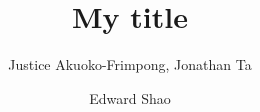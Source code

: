 



\addtolength{\oddsidemargin}{-.5in}%
\addtolength{\evensidemargin}{-1in}%
\addtolength{\textwidth}{1in}%
\addtolength{\textheight}{1.7in}%
\addtolength{\topmargin}{-1in}%



\def\spacingset#1{\renewcommand{\baselinestretch}%
{#1}\small\normalsize} \spacingset{1}

\date{}

\newcommand{\footremember}[2]{%
    \footnote{#2}
    \newcounter{#1}
    \setcounter{#1}{\value{footnote}}%
}
\newcommand{\footrecall}[1]{%
    \footnotemark[\value{#1}]%
} 

\newcommand{\bbR}{\mathbb{R}}
\newcommand{\bX}{\boldsymbol{X}}
\newcommand{\bs}{\boldsymbol{s}}
\newcommand{\Ytilde}{\tilde{Y}}

\newcommand{\mytitle}{My title}  

\title{\bf \mytitle}
\author{Justice Akuoko-Frimpong, Jonathan Ta \and Edward Shao}

\maketitle


\spacingset{1.9} %


